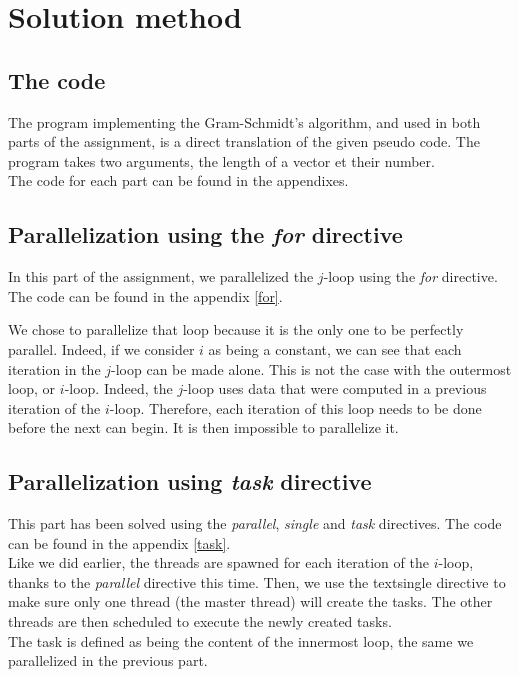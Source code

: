 \chapter{Solution method}

\section{The code}

The program implementing the Gram-Schmidt's algorithm, and used in both parts of the assignment, is a direct translation of the given pseudo code. The program takes two arguments, the length of a vector et their number.\\

The code for each part can be found in the appendixes.

\section{Parallelization using the \textit{for} directive}

In this part of the assignment, we parallelized the $j$-loop using the \textit{for} directive. The code can be found in the appendix \ref{for}.

We chose to parallelize that loop because it is the only one to be perfectly parallel. Indeed, if we consider $i$ as being a constant, we can see that each iteration in the $j$-loop can be made alone. This is not the case with the outermost loop, or $i$-loop. Indeed, the $j$-loop uses data that were computed in a previous iteration of the $i$-loop. Therefore, each iteration of this loop needs to be done before the next can begin. It is then impossible to parallelize it.\\ 

\section{Parallelization using \textit{task} directive}

This part has been solved using the \textit{parallel}, \textit{single} and \textit{task} directives. The code can be found in the appendix \ref{task}.\\

Like we did earlier, the threads are spawned for each iteration of the $i$-loop, thanks to the \textit{parallel} directive this time. Then, we use the text{single} directive to make sure only one thread (the master thread) will create the tasks. The other threads are then scheduled to execute the newly created tasks.\\ 

The task is defined as being the content of the innermost loop, the same we parallelized in the previous part. \\
